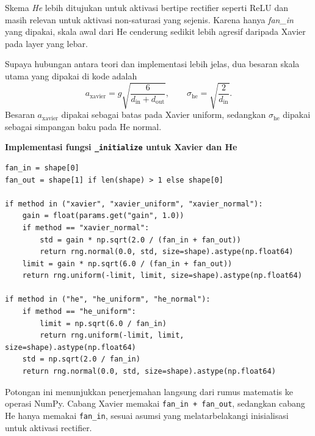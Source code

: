 \documentclass{article}
\begin{document}
Skema \textit{He} lebih ditujukan untuk aktivasi bertipe rectifier seperti ReLU dan masih relevan untuk aktivasi non-saturasi yang sejenis. Karena hanya \textit{fan\_in} yang dipakai, skala awal dari He cenderung sedikit lebih agresif daripada Xavier pada layer yang lebar.

Supaya hubungan antara teori dan implementasi lebih jelas, dua besaran skala utama yang dipakai di kode adalah
\begin{equation}
a_{\text{xavier}} = g\sqrt{\frac{6}{d_{\mathrm{in}}+d_{\mathrm{out}}}},
\qquad
\sigma_{\text{he}} = \sqrt{\frac{2}{d_{\mathrm{in}}}}.
\end{equation}
Besaran $a_{\text{xavier}}$ dipakai sebagai batas pada Xavier uniform, sedangkan $\sigma_{\text{he}}$ dipakai sebagai simpangan baku pada He normal.

\noindent\textbf{Implementasi fungsi \texttt{\_initialize} untuk Xavier dan He}\par
\begin{lstlisting}
fan_in = shape[0]
fan_out = shape[1] if len(shape) > 1 else shape[0]

if method in ("xavier", "xavier_uniform", "xavier_normal"):
    gain = float(params.get("gain", 1.0))
    if method == "xavier_normal":
        std = gain * np.sqrt(2.0 / (fan_in + fan_out))
        return rng.normal(0.0, std, size=shape).astype(np.float64)
    limit = gain * np.sqrt(6.0 / (fan_in + fan_out))
    return rng.uniform(-limit, limit, size=shape).astype(np.float64)

if method in ("he", "he_uniform", "he_normal"):
    if method == "he_uniform":
        limit = np.sqrt(6.0 / fan_in)
        return rng.uniform(-limit, limit, size=shape).astype(np.float64)
    std = np.sqrt(2.0 / fan_in)
    return rng.normal(0.0, std, size=shape).astype(np.float64)
\end{lstlisting}
Potongan ini menunjukkan penerjemahan langsung dari rumus matematis ke operasi NumPy. Cabang Xavier memakai \texttt{fan\_in + fan\_out}, sedangkan cabang He hanya memakai \texttt{fan\_in}, sesuai asumsi yang melatarbelakangi inisialisasi untuk aktivasi rectifier.
\end{document}
